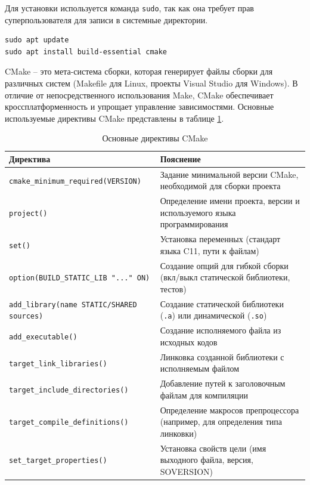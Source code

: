 \documentclass[14pt]{extreport}
\begin{document}
{Для установки используется команда \texttt{sudo}, так как она требует прав суперпользователя для записи в системные директории.

\begin{verbatim}
sudo apt update
sudo apt install build-essential cmake
\end{verbatim}

CMake -- это мета-система сборки, которая генерирует файлы сборки для различных систем (Makefile для Linux, проекты Visual Studio для Windows).
В отличие от непосредственного использования Make, CMake обеспечивает кроссплатформенность и упрощает управление зависимостями. Основные используемые директивы CMake представлены в таблице \ref{tab_cmake}.

\begin{table}[H]
\centering
\renewcommand{\tablename}{\small{Таблица.}}
\caption{\small Основные директивы CMake}
\label{tab_cmake}
\begin{footnotesize}
    \begin{tabular}{|p{6cm}|p{10cm}|}
    \hline
    Директива & Пояснение \\
\hline
    \texttt{cmake\_minimum\_required(VERSION)} & Задание минимальной версии CMake, необходимой для сборки проекта \\
\hline
    \texttt{project()} & Определение имени проекта, версии и используемого языка программирования \\
\hline
    \texttt{set()} & Установка переменных (стандарт языка C11, пути к файлам) \\
\hline
    \texttt{option(BUILD\_STATIC\_LIB "..." ON)} & Создание опций для гибкой сборки (вкл/выкл статической библиотеки, тестов) \\
\hline
    \texttt{add\_library(name STATIC/SHARED sources)} & Создание статической библиотеки (\texttt{.a}) или динамической (\texttt{.so}) \\
\hline
    \texttt{add\_executable()} & Создание исполняемого файла из исходных кодов \\
\hline
    \texttt{target\_link\_libraries()} & Линковка созданной библиотеки с исполняемым файлом \\
\hline
    \texttt{target\_include\_directories()} & Добавление путей к заголовочным файлам для компиляции \\
\hline
    \texttt{target\_compile\_definitions()} & Определение макросов препроцессора (например, для определения типа линковки) \\
\hline
    \texttt{set\_target\_properties()} & Установка свойств цели (имя выходного файла, версия, SOVERSION) \\

\end{tabular}
\end{footnotesize}
\end{table}}
\end{document}

